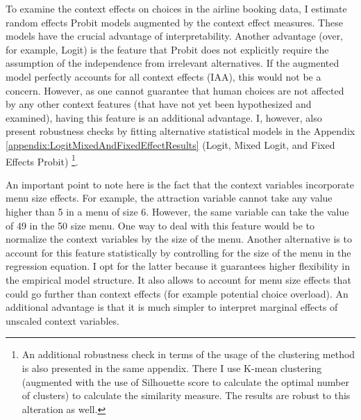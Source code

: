 \documentclass[a4paper,12pt]{article}
\begin{document}
To examine the context effects on choices in the airline booking data, I estimate random effects Probit models augmented by the context effect measures. These models have the crucial advantage of interpretability. Another advantage (over, for example, Logit) is the feature that Probit does not explicitly require the assumption of the independence from irrelevant alternatives. If the augmented model perfectly accounts for all context effects (IAA), this would not be a concern. However, as one cannot guarantee that human choices are not affected by any other context features (that have not yet been hypothesized and examined), having this feature is an additional advantage. I, however, also present robustness checks by fitting alternative statistical models in the Appendix \ref{appendix:LogitMixedAndFixedEffectResults} (Logit, Mixed Logit, and Fixed Effects Probit) \footnote{An additional robustness check in terms of the usage of the clustering method is also presented in the same appendix. There I use K-mean clustering (augmented with the use of Silhouette score \citep{rousseeuw1987silhouettes} to calculate the optimal number of clusters) to calculate the similarity measure. The results are robust to this alteration as well.}.

An important point to note here is the fact that the context variables incorporate menu size effects. For example, the attraction variable cannot take any value higher than 5 in a menu of size 6. However, the same variable can take the value of 49 in the 50 size menu. One way to deal with this feature would be to normalize the context variables by the size of the menu. Another alternative is to account for this feature statistically by controlling for the size of the menu in the regression equation. I opt for the latter because it guarantees higher flexibility in the empirical model structure. It also allows to account for menu size effects that could go further than context effects (for example potential choice overload). An additional advantage is that it is much simpler to interpret marginal effects of unscaled context variables.


\clearpage
\end{document}
